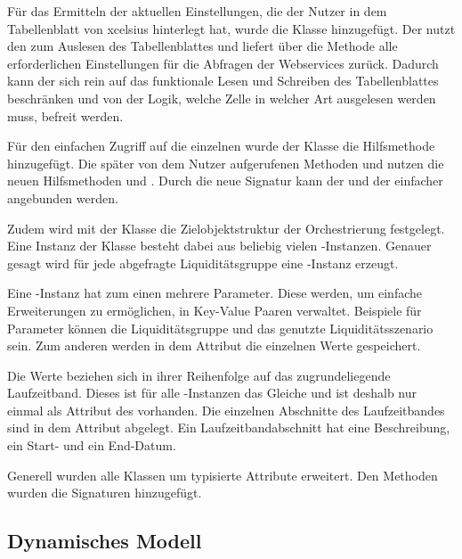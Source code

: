 \begin{onehalfspacing}
Für das Ermitteln der aktuellen Einstellungen, die der Nutzer in dem Tabellenblatt von \gls{xcelsius} hinterlegt hat, wurde die Klasse  hinzugefügt. Der  nutzt den  zum Auslesen des Tabellenblattes und liefert über die Methode  alle erforderlichen Einstellungen für die Abfragen der Webservices zurück. Dadurch kann der  sich rein auf das funktionale Lesen und Schreiben des Tabellenblattes beschränken und von der Logik, welche Zelle in welcher Art ausgelesen werden muss, befreit werden.

Für den einfachen Zugriff auf die einzelnen  wurde der Klasse  die Hilfsmethode  hinzugefügt. Die später von dem Nutzer aufgerufenen Methoden  und  nutzen die neuen Hilfsmethoden  und . Durch die neue Signatur kann der  und der  einfacher angebunden werden.

\label{sec:entwurf:statisch:orchestratorresult}
Zudem wird mit der Klasse  die Zielobjektstruktur der Orchestrierung festgelegt. Eine Instanz der Klasse  besteht dabei aus beliebig vielen -Instanzen. Genauer gesagt wird für jede abgefragte Liquiditätsgruppe eine -Instanz erzeugt.

Eine -Instanz hat zum einen mehrere Parameter. Diese werden, um einfache Erweiterungen zu ermöglichen, in Key-Value Paaren verwaltet. Beispiele für Parameter können die Liquiditätsgruppe und das genutzte Liquiditätsszenario sein. Zum anderen werden in dem Attribut  die einzelnen Werte gespeichert.

Die Werte beziehen sich in ihrer Reihenfolge auf das zugrundeliegende Laufzeitband. Dieses ist für alle -Instanzen das Gleiche und ist deshalb nur einmal als Attribut des  vorhanden. Die einzelnen Abschnitte des Laufzeitbandes sind in dem Attribut  abgelegt. Ein Laufzeitbandabschnitt hat eine Beschreibung, ein Start- und ein End-Datum.

Generell wurden alle Klassen um typisierte Attribute erweitert. Den Methoden wurden die Signaturen hinzugefügt.

\subsection{Dynamisches Modell}


\end{onehalfspacing}
